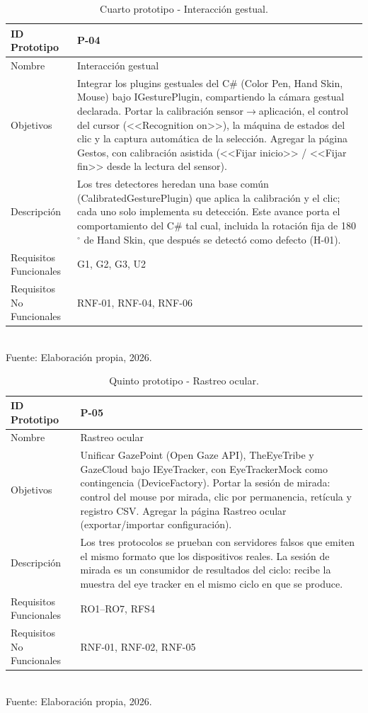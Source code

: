 \begin{table}[h!]
\centering
\caption{Cuarto prototipo - Interacción gestual.}
\label{tab:prototipo-p04}
\begin{tabularx}{\textwidth}{|l|X|}
\hline
ID Prototipo & P-04 \\ \hline
Nombre & Interacción gestual \\ \hline
Objetivos & Integrar los plugins gestuales del C\# (Color Pen, Hand Skin, Mouse) bajo IGesturePlugin, compartiendo la cámara gestual declarada. \newline Portar la calibración sensor$\rightarrow$aplicación, el control del cursor (<<Recognition on>>), la máquina de estados del clic y la captura automática de la selección. \newline Agregar la página Gestos, con calibración asistida (<<Fijar inicio>> / <<Fijar fin>> desde la lectura del sensor). \\ \hline
Descripción & Los tres detectores heredan una base común (CalibratedGesturePlugin) que aplica la calibración y el clic; cada uno solo implementa su detección. Este avance porta el comportamiento del C\# tal cual, incluida la rotación fija de 180$^{\circ}$ de Hand Skin, que después se detectó como defecto (H-01). \\ \hline
Requisitos Funcionales & G1, G2, G3, U2 \\ \hline
Requisitos No Funcionales & RNF-01, RNF-04, RNF-06 \\ \hline
\end{tabularx}
\\[2pt] {\small Fuente: Elaboración propia, 2026.}
\end{table}

\begin{table}[h!]
\centering
\caption{Quinto prototipo - Rastreo ocular.}
\label{tab:prototipo-p05}
\begin{tabularx}{\textwidth}{|l|X|}
\hline
ID Prototipo & P-05 \\ \hline
Nombre & Rastreo ocular \\ \hline
Objetivos & Unificar GazePoint (Open Gaze API), TheEyeTribe y GazeCloud bajo IEyeTracker, con EyeTrackerMock como contingencia (DeviceFactory). \newline Portar la sesión de mirada: control del mouse por mirada, clic por permanencia, retícula y registro CSV. \newline Agregar la página Rastreo ocular (exportar/importar configuración). \\ \hline
Descripción & Los tres protocolos se prueban con servidores falsos que emiten el mismo formato que los dispositivos reales. La sesión de mirada es un consumidor de resultados del ciclo: recibe la muestra del eye tracker en el mismo ciclo en que se produce. \\ \hline
Requisitos Funcionales & RO1–RO7, RFS4 \\ \hline
Requisitos No Funcionales & RNF-01, RNF-02, RNF-05 \\ \hline
\end{tabularx}
\\[2pt] {\small Fuente: Elaboración propia, 2026.}
\end{table}


